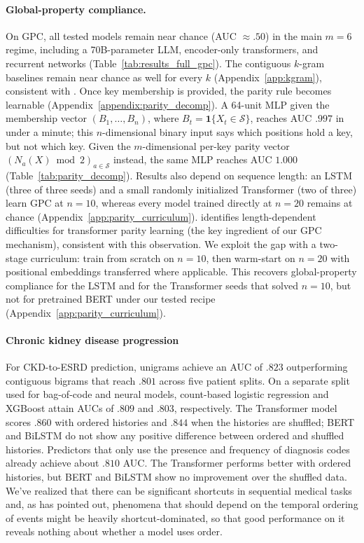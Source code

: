 \documentclass{article} %
\theoremstyle{plain}
\theoremstyle{definition}
\theoremstyle{remark}
\begin{document}
\paragraph{Global-property compliance.}
On GPC, all tested models remain near chance (AUC $\approx .50$) in the main $m=6$ regime, including a 70B-parameter LLM, encoder-only transformers, and recurrent networks (Table~\ref{tab:results_full_gpc}). The contiguous $k$-gram baselines remain near chance as well for every $k$ (Appendix~\ref{app:kgram}), consistent with \citet{countingLLMs}. Once key membership is provided, the parity rule becomes learnable (Appendix~\ref{appendix:parity_decomp}). A 64-unit MLP given the membership vector $(B_1,\ldots,B_n)$, where $B_t=\mathbf{1}\{X_t\in\mathcal{S}\}$, reaches AUC $.997$ in under a minute; this $n$-dimensional binary input says which positions hold a key, but not which key. Given the $m$-dimensional per-key parity vector $(N_a(X)\bmod 2)_{a\in\mathcal{S}}$ instead, the same MLP reaches AUC $1.000$ (Table~\ref{tab:parity_decomp}). Results also depend on sequence length: an LSTM (three of three seeds) and a small randomly initialized Transformer (two of three) learn GPC at $n=10$, whereas every model trained directly at $n=20$ remains at chance (Appendix~\ref{app:parity_curriculum}). \citet{hahn-2020-theoretical} identifies length-dependent difficulties for transformer parity learning (the key ingredient of our GPC mechanism), consistent with this observation. We exploit the gap with a two-stage curriculum: train from scratch on $n=10$, then warm-start on $n=20$ with positional embeddings transferred where applicable. This recovers global-property compliance for the LSTM and for the Transformer seeds that solved $n=10$, but not for pretrained BERT under our tested recipe (Appendix~\ref{app:parity_curriculum}).

\paragraph{Chronic kidney disease progression}
For CKD-to-ESRD prediction, unigrams achieve an AUC of $.823$ outperforming contiguous bigrams that reach $.801$ across five patient splits. On a separate split used for bag-of-code and neural models, count-based logistic regression and XGBoost attain AUCs of $.809$ and $.803$, respectively. The Transformer model scores $.860$ with ordered histories and $.844$ when the histories are shuffled; BERT and BiLSTM do not show any positive difference between ordered and shuffled histories. Predictors that only use the presence and frequency of diagnosis codes already achieve about $.810$ AUC. The Transformer performs better with ordered histories, but BERT and BiLSTM show no improvement over the shuffled data. We've realized that there can be significant shortcuts in sequential medical tasks and, as \cite{klenitskiyDoesItLook2024} has pointed out, phenomena that should depend on the temporal ordering of events might be heavily shortcut-dominated, so that good performance on it reveals nothing about whether a model uses order.
\end{document}
